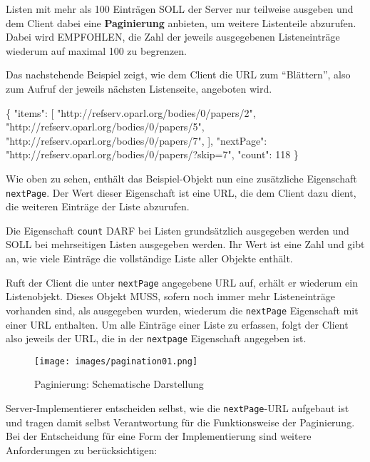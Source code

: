 \documentclass[,a4paper]{article}
\makeatletter
\newenvironment{Shaded}{}{}
\newcommand{\DataTypeTok}[1]{\textcolor[rgb]{0.56,0.13,0.00}{{#1}}}
\newcommand{\DecValTok}[1]{\textcolor[rgb]{0.25,0.63,0.44}{{#1}}}
\newcommand{\StringTok}[1]{\textcolor[rgb]{0.25,0.44,0.63}{{#1}}}
\newcommand{\NormalTok}[1]{{#1}}
\def\maxwidth{\ifdim\Gin@nat@width>\linewidth\linewidth
\else\Gin@nat@width\fi}
\let\Oldincludegraphics\includegraphics
\renewcommand{\includegraphics}[1]{\Oldincludegraphics[width=\maxwidth]{#1}}
\makeatother
\begin{document}
Listen mit mehr als 100 Einträgen SOLL der Server nur teilweise ausgeben
und dem Client dabei eine \textbf{Paginierung} anbieten, um weitere
Listenteile abzurufen. Dabei wird EMPFOHLEN, die Zahl der jeweils
ausgegebenen Listeneinträge wiederum auf maximal 100 zu begrenzen.

Das nachstehende Beispiel zeigt, wie dem Client die URL zum
``Blättern'', also zum Aufruf der jeweils nächsten Listenseite,
angeboten wird.

\begin{Shaded}
\begin{Highlighting}[]
\NormalTok{\{}
    \DataTypeTok{"items"}\NormalTok{: [}
        \StringTok{"http://refserv.oparl.org/bodies/0/papers/2"}\NormalTok{,}
        \StringTok{"http://refserv.oparl.org/bodies/0/papers/5"}\NormalTok{,}
        \StringTok{"http://refserv.oparl.org/bodies/0/papers/7"}\NormalTok{,}
    \NormalTok{],}
    \DataTypeTok{"nextPage"}\NormalTok{: }\StringTok{"http://refserv.oparl.org/bodies/0/papers/?skip=7"}\NormalTok{,}
    \DataTypeTok{"count"}\NormalTok{: }\DecValTok{118}
\NormalTok{\}}
\end{Highlighting}
\end{Shaded}

Wie oben zu sehen, enthält das Beispiel-Objekt nun eine zusätzliche
Eigenschaft \texttt{nextPage}. Der Wert dieser Eigenschaft ist eine URL,
die dem Client dazu dient, die weiteren Einträge der Liste abzurufen.

Die Eigenschaft \texttt{count} DARF bei Listen grundsätzlich ausgegeben
werden und SOLL bei mehrseitigen Listen ausgegeben werden. Ihr Wert ist
eine Zahl und gibt an, wie viele Einträge die vollständige Liste aller
Objekte enthält.

Ruft der Client die unter \texttt{nextPage} angegebene URL auf, erhält
er wiederum ein Listenobjekt. Dieses Objekt MUSS, sofern noch immer mehr
Listeneinträge vorhanden sind, als ausgegeben wurden, wiederum die
\texttt{nextPage} Eigenschaft mit einer URL enthalten. Um alle Einträge
einer Liste zu erfassen, folgt der Client also jeweils der URL, die in
der \texttt{nextpage} Eigenschaft angegeben ist.

\begin{figure}[htbp]
\centering
\texttt{[image: images/pagination01.png]}
\caption{Paginierung: Schematische Darstellung}
\end{figure}

Server-Implementierer entscheiden selbst, wie die \texttt{nextPage}-URL
aufgebaut ist und tragen damit selbst Verantwortung für die
Funktionsweise der Paginierung. Bei der Entscheidung für eine Form der
Implementierung sind weitere Anforderungen zu berücksichtigen:
\end{document}
